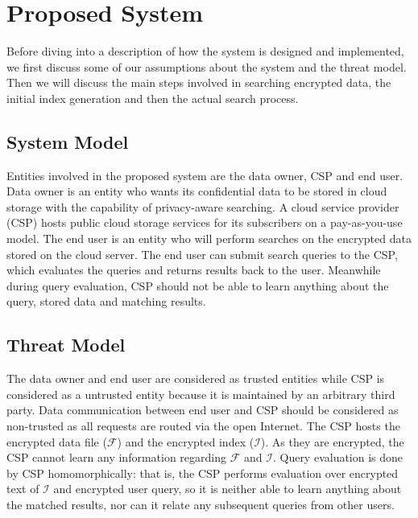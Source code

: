 \section{Proposed System}
\label{sec:system}

Before diving into a description of how the system
is designed and implemented, we first discuss some of our assumptions
about the system and the threat model. Then we will discuss the main
steps involved in searching encrypted data, the initial index generation
and then the actual search process.

\subsection{System Model}

Entities involved in the proposed system are the data owner, CSP and end user.
Data owner is an entity who wants its confidential data to be stored in cloud storage with the capability of privacy-aware searching. 
A cloud service provider (CSP) hosts public cloud storage services for its subscribers on 
a pay-as-you-use model. The end user is an entity who will perform searches on the 
encrypted data stored on the cloud server. The end user can submit search queries 
to the CSP, which evaluates the queries and returns results back to the user. 
Meanwhile during query evaluation, CSP should not be able to learn anything about the query, stored 
data and matching results.

\subsection{Threat Model}

The data owner and end user are considered as trusted entities while CSP 
is considered as a untrusted entity because it is maintained by an 
arbitrary third party. Data communication between end user and CSP should 
be considered as non-trusted as all requests are routed via the open Internet. 
The CSP hosts the encrypted data file ($\mathcal{F}$) and the encrypted index ($\mathcal{I}$). 
As they are encrypted, the CSP cannot learn any information regarding $\mathcal{F}$ and $\mathcal{I}$. 
Query evaluation is done by CSP homomorphically: that is, the CSP performs 
evaluation over encrypted text of $\mathcal{I}$ and encrypted user query, 
so it is neither able to learn anything about the matched results, nor
can it relate any subsequent queries from other users. 


